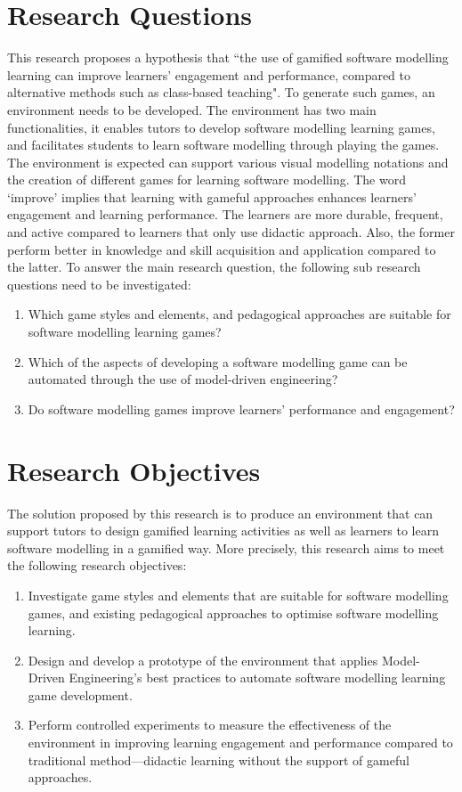 \documentclass[12pt, a4paper]{report} \usepackage[titletoc]{appendix}
\begin{document}
\section{Research Questions}
This research proposes a hypothesis that ``the use of gamified software modelling learning can improve learners' engagement and performance, compared to alternative methods such as class-based teaching". To generate such games, an environment needs to be developed. The environment has two main functionalities, it enables tutors to develop software modelling learning games, and facilitates students to learn software modelling through playing the games. The environment is expected can support various visual modelling notations and the creation of different games for learning software modelling. The word `improve' implies that learning with gameful approaches enhances learners' engagement and learning performance. The learners are more durable, frequent, and active compared to learners that only use didactic approach. Also, the former perform better in knowledge and skill acquisition and application compared to the latter. To answer the main research question, the following sub research questions need to be investigated:
\begin{enumerate} 
\item Which game styles and elements, and pedagogical approaches are suitable for software modelling learning games?
\item Which of the aspects of developing a software modelling game can be automated through the use of model-driven engineering?
\item Do software modelling games improve learners' performance and engagement?
\end{enumerate}

\section{Research Objectives}
The solution proposed by this research is to produce an environment that can support tutors to design gamified learning activities as well as learners to learn software modelling in a gamified way. More precisely, this research aims to meet the following research objectives:
\begin{enumerate}
\item Investigate game styles and elements that are suitable for software modelling games, and existing pedagogical approaches to optimise software modelling learning.
\item Design and develop a prototype of the environment that applies Model-Driven Engineering's best practices to automate software modelling learning game development. 
\item Perform controlled experiments to measure the effectiveness of the environment in improving learning engagement and performance compared to traditional method---didactic learning without the support of gameful approaches.
\end{enumerate}
\end{document}
